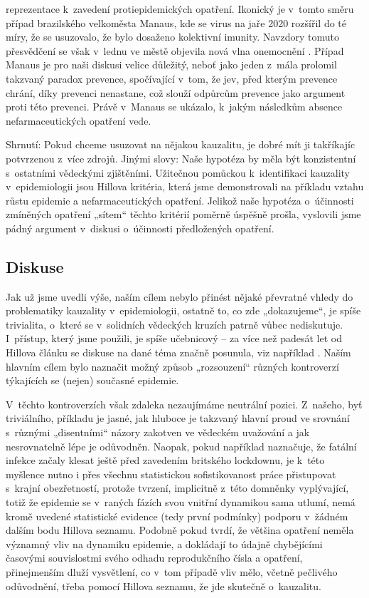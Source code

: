\begin{enumerate}
reprezentace k~zavedení protiepidemických opatření. Ikonický je
v~tomto směru případ brazilského velkoměsta Manaus, kde se virus na
jaře 2020 rozšířil do té míry, že se usuzovalo, že bylo dosaženo kolektivní
imunity. Navzdory tomuto přesvědčení se však v~lednu ve městě objevila
nová vlna onemocnění \cite{sabino2021resurgence}. 
Případ Manaus je pro naši diskusi velice důležitý, neboť jako jeden z~mála
prolomil takzvaný paradox prevence, spočívající v~tom, že jev, před kterým prevence chrání, díky prevenci nenastane, což slouží odpůrcům prevence jako argument proti této prevenci. Právě v~Manaus se ukázalo, k~jakým následkům absence nefarmaceutických opatření vede.

\end{enumerate}

Shrnutí: Pokud chceme usuzovat na nějakou kauzalitu, je dobré mít ji takříkajíc potvrzenou z~více zdrojů. Jinými slovy: Naše hypotéza by měla být konzistentní s~ostatními vědeckými zjištěními. Užitečnou pomůckou k~identifikaci kauzality v~epidemiologii jsou Hillova kritéria, která jsme demonstrovali na příkladu vztahu růstu epidemie a nefarmaceutických opatření. Jelikož naše hypotéza o~účinnosti zmíněných opatření „sítem“ těchto kritérií poměrně úspěšně prošla, vyslovili jsme pádný argument v~diskusi o~účinnosti předložených opatření.

\subsection*{Diskuse}

Jak už jsme uvedli výše, naším cílem nebylo přinést nějaké převratné
vhledy do problematiky kauzality v~epidemiologii, ostatně to, co zde
„dokazujeme“, je spíše trivialita, o~které se v~solidních vědeckých
kruzích patrně vůbec nediskutuje. I~přístup, který jsme použili, je
spíše učebnicový -- za více než padesát let od Hillova článku se
diskuse na dané téma značně posunula, viz například \cite{rothman2005causation}.
Naším hlavním cílem bylo naznačit možný způsob „rozsouzení“ různých kontroverzí týkajících se (nejen) současné epidemie. 

V~těchto kontroverzích však zdaleka nezaujímáme neutrální pozici. Z~našeho, byť triviálního, příkladu je jasné, jak hluboce je takzvaný hlavní proud ve srovnání s~různými „disentními“
názory zakotven ve vědeckém uvažování a jak nesrovnatelně lépe je
odůvodněn. Naopak, pokud například \cite{wood2021inferring} naznačuje, že fatální infekce
začaly klesat ještě před zavedením britského lockdownu, je k~této
myšlence nutno i přes všechnu statistickou sofistikovanost práce přistupovat
s~krajní o\-be\-zřet\-nos\-tí, protože tvrzení, implicitně z~této domněnky
vyplývající, totiž že epidemie se v~raných fázích svou vnitřní dynamikou
sama utlumí, nemá kromě uvedené statistické evidence (tedy první podmínky) podporu v~žádném dalším bodu Hillova seznamu. Podobně pokud \cite{KomarekStraka2021} tvrdí, že většina opatření neměla významný vliv na dynamiku epidemie, a dokládají to údajně chybějícími časovými souvislostmi svého odhadu reprodukčního čísla a opatření, přinejmenším dluží vysvětlení, co v~tom případě vliv mělo, včetně pečlivého odůvodnění, třeba pomocí Hillova seznamu, že jde skutečně o~kauzalitu.
